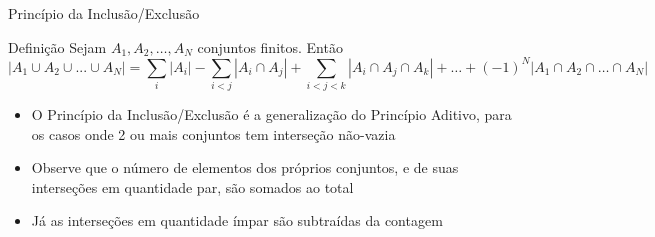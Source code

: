 \begin{frame}[fragile]{Princípio da Inclusão/Exclusão}

    \begin{block}{Definição}
        Sejam $A_1, A_2, \ldots, A_N$ conjuntos finitos. Então
        \[
            | A_1 \cup A_2 \cup ... \cup A_N | = \sum_i | A_i | - \sum_{i<j} | A_i \cap A_j | + \sum_{i<j<k}| A_i \cap A_j \cap A_k | 
                               + \ldots + (-1)^N | A_1 \cap A_2 \cap \ldots \cap A_N |
        \]
    \end{block}

    \vspace{0.2in}

    \begin{itemize}
        \item O Princípio da Inclusão/Exclusão é a generalização do Princípio Aditivo, para os casos onde 2 ou mais conjuntos tem interseção não-vazia

        \item Observe que o número de elementos dos próprios conjuntos, e de suas interseções em quantidade par, são somados ao total

        \item Já as interseções em quantidade ímpar são subtraídas da contagem
    \end{itemize}

\end{frame}
